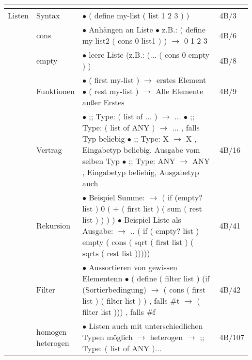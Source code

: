 \documentclass[11pt,a4paper]{article}
\begin{document}
\begin{center}
\begin{longtable}[h]{ | p{3cm} | p{3cm} | p{11cm} | p{1.2cm} | }
	\multicolumn{3}{c}{} \\ 
	\hline 	
	
	{\large Listen} & Syntax & $\bullet$ ( define my-list ( list 1 2 3 ) ) & 4B/3 \\ \cline{2-4}
	& cons & \makecell[l]{$\bullet$ Anhängen an Liste \\ $\bullet$ z.B.: ( define my-list2 ( cons 0 list1 ) ) \\ \hspace{0.4cm} $\rightarrow$ 0 1 2 3} & 4B/6 \\ \cline{2-4}
	& empty & $\bullet$ leere Liste (z.B.: (... ( cons 0 empty ) ) & 4B/8 \\ \cline{2-4}
	& Funktionen & \makecell[l]{$\bullet$ ( first my-list ) $\rightarrow$ erstes Element \\ $\bullet$ ( rest my-list ) $\rightarrow$ Alle Elemente außer Erstes } & 4B/9 \\ \cline{2-4}
	& Vertrag & \makecell[l]{$\bullet$ ;; Type: ( list of ... ) $\rightarrow$ ... \\ $\bullet$ ;; Type: ( list of ANY ) $\rightarrow$ ... , falls Typ beliebig \\ 
	$\bullet$ ;; Type: X $\rightarrow$ X , Eingabetyp beliebig, Ausgabe vom selben Typ \\ 
	$\bullet$ ;; Type: ANY $\rightarrow$ ANY , Eingabetyp beliebig, Ausgabetyp auch} & 4B/16 \\ \cline{2-4}
	& Rekursion & \makecell[l]{$\bullet$ Beispiel Summe: \\ \hspace{0.2cm} $\rightarrow$ ( if (empty? list ) 0 ( + ( first list ) ( sum ( rest list ) ) ) ) \\ 
	$\bullet$ Beispiel Liste als Ausgabe: \\
	\hspace{0.2cm} $\rightarrow$ .. ( if ( empty? list ) empty ( \\ \hspace{2.5cm} cons ( sqrt ( first list ) ( sqrts ( rest list ))))) } & 4B/41 \\ \cline{2-4}
	& Filter & \makecell[l]{$\bullet$ Aussortieren von gewissen Elementenn \\ \hspace{0.2cm} $\bullet$ ( define ( filter list ) (if (Sortierbedingung)  
	\\ \hspace{0.2cm} $\rightarrow$ ( cons ( first list ) ( filter list ) ) , falls \#t \\ 
	\hspace{0.2cm} $\rightarrow$ ( filter list ))) , falls \#f } &  4B/42 \\ \cline{2-4}
	& \makecell[l]{homogen \\ heterogen} & \makecell[l]{$\bullet$ Listen auch mit unterschiedlichen Typen möglich $\rightarrow$ heterogen \\ 
	\hspace{0.4cm} $\rightarrow$ ;; Type: ( list of ANY )... } & 4B/107 \\
	\hline
	

\end{longtable}
\end{center}
\end{document}
